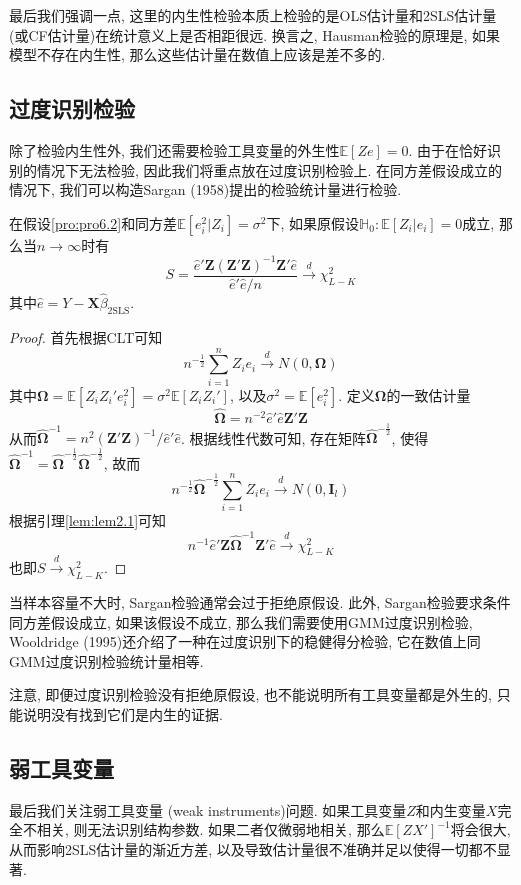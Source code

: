 \documentclass[cn, 12pt, math=mtpro2, bibstyle=apa, blue, twocol]{elegantbook}
\newcommand{\E}{\mathbb{E}}
\newcommand{\X}{\mathbold{X}}
\newcommand{\Z}{\mathbold{Z}}
\newcommand{\hb}{\hat{\beta}}
\newcommand{\HH}{\mathbb{H}}
\newcommand{\BO}{\mathbold{\Omega}}
\begin{document}
最后我们强调一点, 这里的内生性检验本质上检验的是OLS估计量和2SLS估计量 (或CF估计量)在统计意义上是否相距很远. 换言之, Hausman检验的原理是, 如果模型不存在内生性, 那么这些估计量在数值上应该是差不多的.


\subsection{过度识别检验}
除了检验内生性外, 我们还需要检验工具变量的外生性$\E[Ze]=0$. 由于在恰好识别的情况下无法检验, 因此我们将重点放在过度识别检验上. 在同方差假设成立的情况下, 我们可以构造Sargan (1958)提出的检验统计量进行检验.
\begin{theorem}\label{thm:thm6.4}
  在假设\ref{pro:pro6.2}和同方差$\E[e_i^2|Z_i]=\sigma^2$下, 如果原假设$\HH_0:\E[Z_i|e_i]=0$成立, 那么当$n\to\infty$时有
  $$S=\frac{\hat{e}'\Z(\Z'\Z)^{-1}\Z'\hat{e}}{\hat{e}'\hat{e}/n}\xrightarrow{d}\chi^2_{L-K}$$
  其中$\hat{e}=Y-\X\hb_{\text{2SLS}}$.
\end{theorem}
\begin{proof}
  首先根据CLT可知
  $$n^{-\frac{1}{2}}\sum_{i=1}^{n}Z_ie_i\xrightarrow{d}N(0,\BO)$$
  其中$\BO=\E[Z_iZ_i'e_i^2]=\sigma^2\E[Z_iZ_i']$, 以及$\sigma^2=\E[e_i^2]$. 定义$\BO$的一致估计量
  $$\hat{\BO}=n^{-2}\hat{e}'\hat{e}\Z'\Z$$
  从而$\hat{\BO}^{-1}=n^2(\Z'\Z)^{-1}/\hat{e}'\hat{e}$. 根据线性代数可知, 存在矩阵$\hat{\BO}^{-\frac{1}{2}}$, 使得$\hat{\BO}^ {-1}=\hat{\BO}^{-\frac{1}{2}}\hat{\BO}^{-\frac{1}{2}}$, 故而
  $$n^{-\frac{1}{2}}\hat{\BO}^{-\frac{1}{2}}\sum_{i=1}^{n}Z_ie_i\xrightarrow{d}N(0,\mathbold{I}_l)$$
  根据引理\ref{lem:lem2.1}可知
  $$n^{-1}\hat{e}'\Z\hat{\BO}^{-1}\Z'\hat{e}\xrightarrow{d}\chi^2_{L-K}$$
  也即$S\xrightarrow{d}\chi^2_{L-K}$.
\end{proof}
当样本容量不大时, Sargan检验通常会过于拒绝原假设. 此外, Sargan检验要求条件同方差假设成立, 如果该假设不成立, 那么我们需要使用GMM过度识别检验, Wooldridge (1995)还介绍了一种在过度识别下的稳健得分检验, 它在数值上同GMM过度识别检验统计量相等.

注意, 即便过度识别检验没有拒绝原假设, 也不能说明所有工具变量都是外生的, 只能说明没有找到它们是内生的证据.
\subsection{弱工具变量}
最后我们关注弱工具变量 (weak instruments)问题. 如果工具变量$Z$和内生变量$X$完全不相关, 则无法识别结构参数. 如果二者仅微弱地相关, 那么$\E[ZX']^{-1}$将会很大, 从而影响2SLS估计量的渐近方差, 以及导致估计量很不准确并足以使得一切都不显著.
\end{document}
